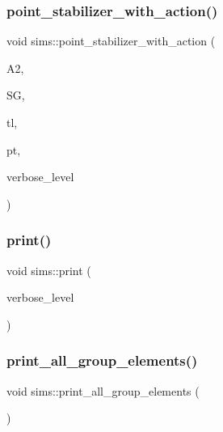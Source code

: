 \mbox{\label{classsims_a3c07d7fe18b848f6c62bc4f9616747ed}} 
\subsubsection{\texorpdfstring{point\+\_\+stabilizer\+\_\+with\+\_\+action()}{point\_stabilizer\_with\_action()}}
{\footnotesize\ttfamily void sims\+::point\+\_\+stabilizer\+\_\+with\+\_\+action (\begin{DoxyParamCaption}\item[{\mbox{\hyperlink{classaction}{action}} $\ast$}]{A2,  }\item[{\mbox{\hyperlink{classvector__ge}{vector\+\_\+ge}} \&}]{SG,  }\item[{\mbox{\hyperlink{galois_8h_a09fddde158a3a20bd2dcadb609de11dc}{I\+NT}} $\ast$}]{tl,  }\item[{\mbox{\hyperlink{galois_8h_a09fddde158a3a20bd2dcadb609de11dc}{I\+NT}}}]{pt,  }\item[{\mbox{\hyperlink{galois_8h_a09fddde158a3a20bd2dcadb609de11dc}{I\+NT}}}]{verbose\+\_\+level }\end{DoxyParamCaption})}

\mbox{\label{classsims_a93c3d22dc3ac6d78acc60bad65234944}} 
\subsubsection{\texorpdfstring{print()}{print()}}
{\footnotesize\ttfamily void sims\+::print (\begin{DoxyParamCaption}\item[{\mbox{\hyperlink{galois_8h_a09fddde158a3a20bd2dcadb609de11dc}{I\+NT}}}]{verbose\+\_\+level }\end{DoxyParamCaption})}

\mbox{\label{classsims_a000c1f285c6678fe7f591ced343588aa}} 
\subsubsection{\texorpdfstring{print\+\_\+all\+\_\+group\+\_\+elements()}{print\_all\_group\_elements()}}
{\footnotesize\ttfamily void sims\+::print\+\_\+all\+\_\+group\+\_\+elements (\begin{DoxyParamCaption}{ }\end{DoxyParamCaption})}

